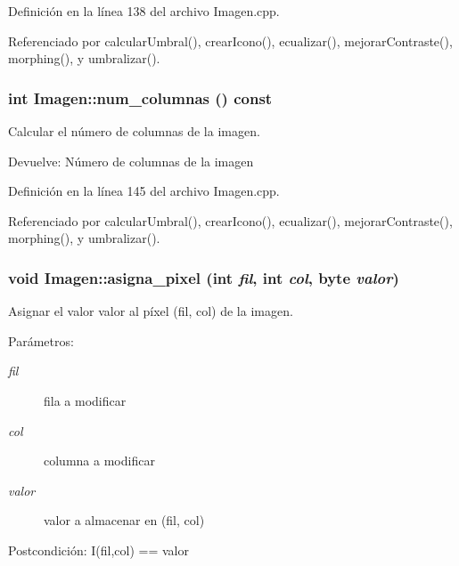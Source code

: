 Definición en la línea 138 del archivo Imagen.cpp.

Referenciado por calcularUmbral(), crearIcono(), ecualizar(), mejorarContraste(), morphing(), y umbralizar().\hypertarget{classImagen_29f1a1d6a8b9afb41036d76e9d64d4eb}{
\subsubsection[num\_\-columnas]{\setlength{\rightskip}{0pt plus 5cm}int Imagen::num\_\-columnas () const}}
\label{classImagen_29f1a1d6a8b9afb41036d76e9d64d4eb}


Calcular el número de columnas de la imagen. 

\begin{Desc}
\item[Devuelve:]Número de columnas de la imagen \end{Desc}


Definición en la línea 145 del archivo Imagen.cpp.

Referenciado por calcularUmbral(), crearIcono(), ecualizar(), mejorarContraste(), morphing(), y umbralizar().\hypertarget{classImagen_566a2ba8ed9fbc3d79b77e162e9cc740}{
\subsubsection[asigna\_\-pixel]{\setlength{\rightskip}{0pt plus 5cm}void Imagen::asigna\_\-pixel (int {\em fil}, \/  int {\em col}, \/  {\bf byte} {\em valor})}}
\label{classImagen_566a2ba8ed9fbc3d79b77e162e9cc740}


Asignar el valor valor al píxel (fil, col) de la imagen. 

\begin{Desc}
\item[Parámetros:]
\begin{description}
\item[{\em fil}]fila a modificar \item[{\em col}]columna a modificar \item[{\em valor}]valor a almacenar en (fil, col) \end{description}
\end{Desc}
\begin{Desc}
\item[Postcondición:]I(fil,col) == valor \end{Desc}


